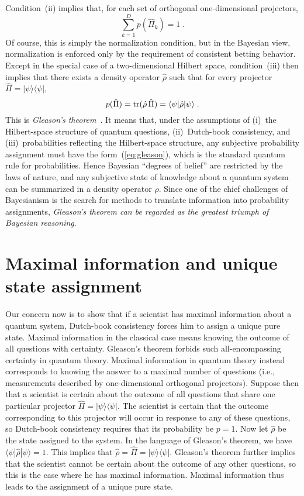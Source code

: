 Condition~(ii) implies that, for each set of orthogonal
one-dimensional projectors,
\begin{equation}
\sum_{k=1}^D p(\hat\Pi_k) = 1 \;.
\end{equation}
Of course, this is simply the normalization condition, but in the
Bayesian view, normalization is enforced only by the requirement of
consistent betting behavior.  Except in the special case of a
two-dimensional Hilbert space, condition~(iii) then implies that
there exists a density operator $\hat\rho$ such that for every
projector $\hat\Pi=|\psi\rangle\langle\psi|$,
\begin{equation}
p(\hat\Pi)={\rm tr}(\hat\rho\,\hat\Pi)=\langle\psi|\hat\rho|\psi\rangle \;.
\label{eq:gleason}
\end{equation}
This is {\it Gleason's theorem}~\cite{Gleason57}. It means that,
under the assumptions of (i)~the Hilbert-space structure of quantum
questions, (ii)~Dutch-book consistency, and (iii)~probabilities
reflecting the Hilbert-space structure, any subjective probability
assignment must have the form~(\ref{eq:gleason}), which is the
standard quantum rule for probabilities.  Hence Bayesian ``degrees of
belief'' are restricted by the laws of nature, and any subjective
state of knowledge about a quantum system can be summarized in a
density operator $\hat\rho$.  Since one of the chief challenges of
Bayesianism is the search for methods to translate information into
probability assignments, {\it Gleason's theorem can be regarded as
the greatest triumph of Bayesian reasoning}.

\section{Maximal information and unique state assignment} \label{sec:unique}

Our concern now is to show that if a scientist has maximal
information about a quantum system, Dutch-book consistency forces him
to assign a unique pure state.  Maximal information in the classical
case means knowing the outcome of all questions with certainty.
Gleason's theorem forbids such all-encompassing certainty in quantum
theory.  Maximal information in quantum theory instead corresponds to
knowing the answer to a maximal number of questions (i.e.,
measurements described by one-dimensional orthogonal projectors).
Suppose then that a scientist is certain about the outcome of all
questions that share one particular projector
$\hat\Pi=|\psi\rangle\langle\psi|$. The scientist is certain that the
outcome corresponding to this projector will occur in response to any
of these questions, so Dutch-book consistency requires that its
probability be $p=1$.  Now let $\hat\rho$ be the state assigned to
the system.  In the language of Gleason's theorem, we have
$\langle\psi|\hat\rho|\psi\rangle=1$. This implies that
$\hat\rho=\hat\Pi=|\psi\rangle\langle\psi|$. Gleason's theorem
further implies that the scientist cannot be certain about the
outcome of any other questions, so this is the case where he has
maximal information.  Maximal information thus leads to the
assignment of a unique pure state.

